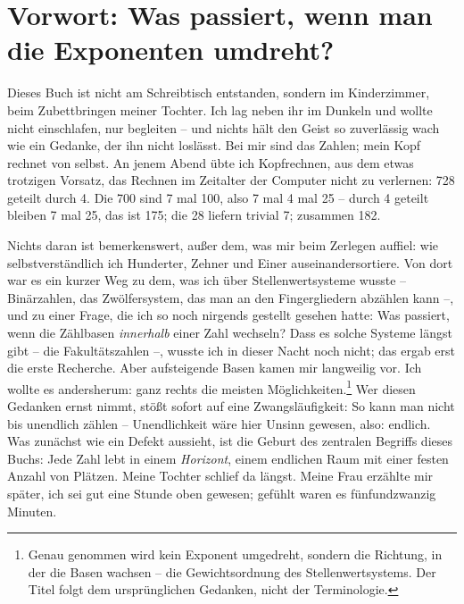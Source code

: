 \chapter*{Vorwort: Was passiert, wenn man die Exponenten umdreht?}

Dieses Buch ist nicht am Schreibtisch entstanden, sondern im
Kinderzimmer, beim Zubettbringen meiner Tochter. Ich lag
neben ihr im Dunkeln und wollte nicht einschlafen, nur begleiten --
und nichts hält den Geist so zuverlässig wach wie ein Gedanke, der
ihn nicht loslässt. Bei mir sind das Zahlen; mein Kopf rechnet von
selbst. An jenem Abend übte ich Kopfrechnen, aus dem etwas
trotzigen Vorsatz, das Rechnen im Zeitalter der Computer nicht zu
verlernen: 728 geteilt durch 4. Die 700 sind 7 mal 100, also 7 mal
4 mal 25 -- durch 4 geteilt bleiben 7 mal 25, das ist 175; die 28
liefern trivial 7; zusammen 182.

Nichts daran ist bemerkenswert, außer dem, was mir beim Zerlegen
auffiel: wie selbstverständlich ich Hunderter, Zehner und Einer
auseinandersortiere. Von dort war es ein kurzer Weg zu dem, was ich
über Stellenwertsysteme wusste -- Binärzahlen, das Zwölfersystem,
das man an den Fingergliedern abzählen kann --, und zu einer Frage,
die ich so noch nirgends gestellt gesehen hatte: Was passiert, wenn
die Zählbasen \emph{innerhalb} einer Zahl wechseln? Dass es solche
Systeme längst gibt -- die Fakultätszahlen --, wusste ich in dieser
Nacht noch nicht; das ergab erst die erste Recherche. Aber
aufsteigende Basen kamen mir langweilig vor. Ich wollte es
andersherum: ganz rechts die meisten
Möglichkeiten.\footnote{Genau genommen wird kein Exponent
umgedreht, sondern die Richtung, in der die Basen wachsen -- die
Gewichtsordnung des Stellenwertsystems. Der Titel folgt dem
ursprünglichen Gedanken, nicht der Terminologie.} Wer diesen
Gedanken ernst nimmt, stößt sofort auf eine Zwangsläufigkeit: So
kann man nicht bis unendlich zählen -- Unendlichkeit wäre hier
Unsinn gewesen, also: endlich. Was zunächst wie ein Defekt
aussieht, ist die Geburt des zentralen Begriffs dieses Buchs: Jede
Zahl lebt in einem \emph{Horizont}, einem endlichen Raum mit einer
festen Anzahl von Plätzen. Meine Tochter schlief da längst. Meine Frau
erzählte mir später, ich sei gut eine Stunde oben gewesen; gefühlt
waren es fünfundzwanzig Minuten.

